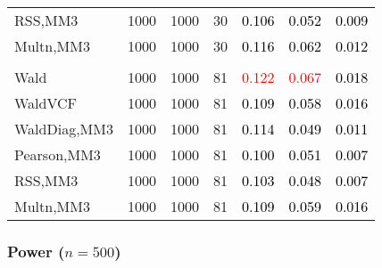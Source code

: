 \documentclass[
]{article}
\begin{document}
\begin{table}[H]
{\begin{tabular}[t]{lrrrrrr}
\hspace{1em}RSS,MM3 & 1000 & 1000 & 30 & \textcolor{black}{0.106} & \textcolor{black}{0.052} & \textcolor{black}{0.009}\\
\hspace{1em}Multn,MM3 & 1000 & 1000 & 30 & \textcolor{black}{0.116} & \textcolor{black}{0.062} & \textcolor{black}{0.012}\\
\addlinespace[0.3em]
\multicolumn{7}{l}{\textbf{3F 15V}}\\
\hspace{1em}Wald & 1000 & 1000 & 81 & \textcolor{red}{0.122} & \textcolor{red}{0.067} & \textcolor{black}{0.018}\\
\hspace{1em}WaldVCF & 1000 & 1000 & 81 & \textcolor{black}{0.109} & \textcolor{black}{0.058} & \textcolor{black}{0.016}\\
\hspace{1em}WaldDiag,MM3 & 1000 & 1000 & 81 & \textcolor{black}{0.114} & \textcolor{black}{0.049} & \textcolor{black}{0.011}\\
\hspace{1em}Pearson,MM3 & 1000 & 1000 & 81 & \textcolor{black}{0.100} & \textcolor{black}{0.051} & \textcolor{black}{0.007}\\
\hspace{1em}RSS,MM3 & 1000 & 1000 & 81 & \textcolor{black}{0.103} & \textcolor{black}{0.048} & \textcolor{black}{0.007}\\
\hspace{1em}Multn,MM3 & 1000 & 1000 & 81 & \textcolor{black}{0.109} & \textcolor{black}{0.059} & \textcolor{black}{0.016}\\
\bottomrule
\end{tabular}}
\endgroup{}
\end{table}

\subsubsection{\texorpdfstring{Power
(\(n=500\))}{Power (n=500)}}\label{power-n500-2}
\end{document}
